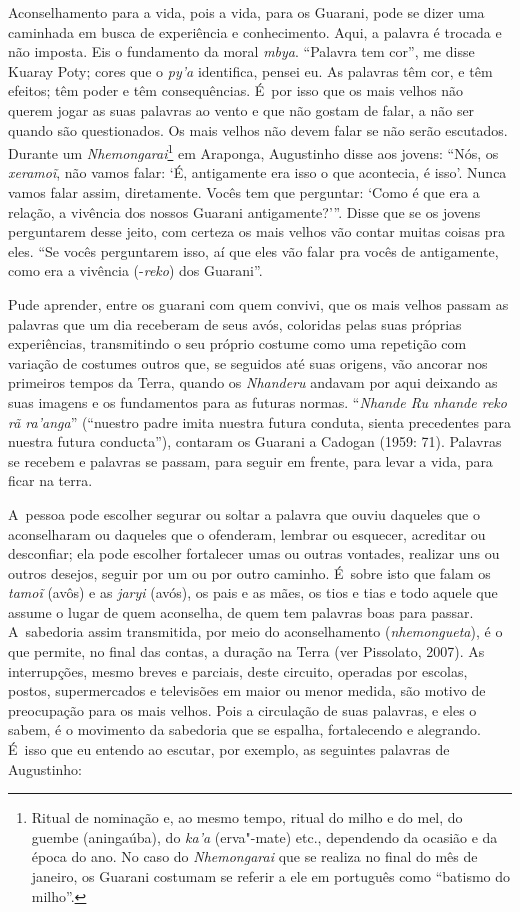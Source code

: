 Aconselhamento para a vida, pois a vida, para os Guarani, pode se dizer
uma caminhada em busca de experiência e conhecimento. Aqui, a palavra é
trocada e não imposta. Eis o fundamento da moral \emph{mbya}. ``Palavra tem
cor'', me disse Kuaray Poty; cores que o \emph{py’a} identifica, pensei eu. As
palavras têm cor, e têm efeitos; têm poder e têm consequências. É~por
isso que os mais velhos não querem jogar as suas palavras ao vento e
que não gostam de falar, a não ser quando são questionados. Os mais velhos
não devem falar se não serão escutados. Durante um
\emph{Nhemongarai}\footnote{Ritual de nominação e, ao mesmo tempo, ritual do
milho e do mel, do guembe (aningaúba), do \emph{ka’a} (erva"-mate) etc.,
dependendo da ocasião e da época do ano. No caso do \emph{Nhemongarai} que se
realiza no final do mês de janeiro, os Guarani costumam se referir a
ele em português como ``batismo do milho''.} em Araponga, Augustinho
disse aos jovens: ``Nós, os \emph{xeramoĩ}, não vamos falar: ‘É,
antigamente era isso o que acontecia, é isso’. Nunca vamos falar assim,
diretamente. Vocês tem que perguntar: ‘Como é que era a relação, a
vivência dos nossos Guarani antigamente?’''. Disse que se os jovens
perguntarem desse jeito, com certeza os mais velhos vão contar muitas
coisas pra eles. ``Se vocês perguntarem isso, aí que eles vão falar pra
vocês de antigamente, como era a vivência (-\emph{reko}) dos Guarani''. 

Pude aprender, entre os guarani com quem convivi, que os mais velhos
passam as palavras que um dia receberam de seus avós, coloridas pelas
suas próprias experiências, transmitindo o seu próprio costume como uma
repetição com variação de costumes outros que, se seguidos até suas
origens, vão ancorar nos primeiros tempos da Terra, quando os \emph{Nhanderu}
andavam por aqui deixando as suas imagens e os fundamentos para as
futuras normas. ``\emph{Nhande Ru nhande reko rã ra’anga}'' (``nuestro padre
imita nuestra futura conduta, sienta precedentes para nuestra futura
conducta''), contaram os Guarani a Cadogan (1959: 71). Palavras se
recebem e palavras se passam, para seguir em frente, para levar a vida,
para ficar na terra.

A~pessoa pode escolher segurar ou soltar a palavra que ouviu daqueles
que o aconselharam ou daqueles que o ofenderam, lembrar ou esquecer,
acreditar ou desconfiar; ela pode escolher fortalecer umas ou outras
vontades, realizar uns ou outros desejos, seguir por um ou por outro
caminho. É~sobre isto que falam os \emph{tamoĩ} (avôs) e as \emph{jaryi} (avós),
os pais e as mães, os tios e tias e todo aquele que assume o lugar de
quem aconselha, de quem tem palavras boas para passar. A~sabedoria
assim transmitida, por meio do aconselhamento (\emph{nhemongueta}), é o que
permite, no final das contas, a duração na Terra (ver Pissolato, 2007).
As interrupções, mesmo breves e parciais, deste circuito, operadas por
escolas, postos, supermercados e televisões em maior ou menor medida,
são motivo de preocupação para os mais velhos. Pois a circulação de
suas palavras, e eles o sabem, é o movimento da sabedoria que se
espalha, fortalecendo e alegrando. É~isso que eu entendo ao escutar,
por exemplo, as seguintes palavras de Augustinho:

